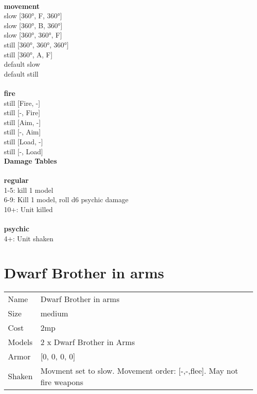 \ \\ {\bf movement } \\
slow [360°, F, 360°] \\
slow [360°, B, 360°] \\
slow [360°, 360°, F] \\
still [360°, 360°, 360°] \\
still [360°, A, F] \\
default slow \\
default still \\
\ \\ {\bf fire } \\
still [Fire, -] \\
still [-, Fire] \\
still [Aim, -] \\
still [-, Aim] \\
still [Load, -] \\
still [-, Load] \\


{\bf Damage Tables} \\
\ \\ {\bf regular } \\
1-5: kill 1 model \\
6-9: Kill 1 model, roll d6 psychic damage \\
10+: Unit killed \\
\ \\ {\bf psychic } \\
4+: Unit shaken \\










\pagebreak\pagebreak

\section{ Dwarf Brother in arms }

\begin{tabular}{ll}
  Name & Dwarf Brother in arms \\
  Size & medium\\
  Cost & 2mp\\
  Models & 2 x Dwarf Brother in Arms\\
  Armor & [0, 0, 0, 0]\\
  Shaken & Movment set to slow. Movement order: [-,-,flee]. May not fire weapons\\
\end{tabular}


